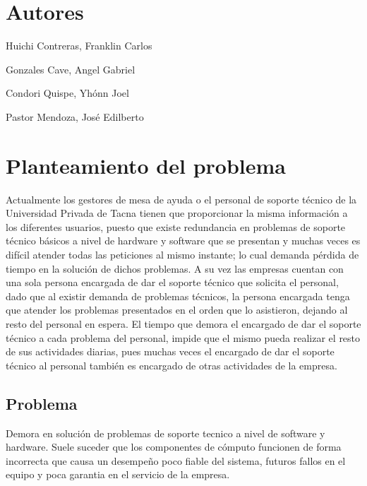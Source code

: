 \documentclass[preprint,12pt]{elsarticle}
\begin{document}


\section{Autores}
Huichi Contreras, Franklin Carlos 

Gonzales Cave, Angel Gabriel

Condori Quispe, Yhónn Joel	
 
Pastor Mendoza, José Edilberto




\section{Planteamiento del problema}
Actualmente los gestores de mesa de ayuda o el personal de soporte técnico de la Universidad Privada de Tacna tienen que proporcionar la misma información a los diferentes usuarios, puesto que existe redundancia en problemas de soporte técnico básicos a nivel de hardware y software que se presentan y muchas veces es difícil atender todas las peticiones al mismo instante; lo cual demanda pérdida de tiempo en la solución de dichos problemas. A su vez las empresas  cuentan con una sola persona encargada de dar el soporte técnico que solicita el personal, dado que al existir demanda de problemas técnicos, la persona encargada tenga que atender los problemas presentados en el orden que lo asistieron, dejando al resto del personal en espera. El tiempo que demora el encargado de dar el soporte técnico a cada problema del personal, impide que el mismo pueda realizar el resto de sus actividades diarias, pues muchas veces el encargado de dar el soporte técnico al personal también es encargado de otras actividades de la empresa. 


\subsection {\textbf{Problema}}
Demora en solución de problemas de soporte tecnico a nivel de software y hardware. Suele suceder que los componentes de cómputo funcionen de forma incorrecta que causa un desempeño poco fiable del sistema, futuros fallos en el equipo y poca garantia en el servicio de la empresa.
\end{document}
